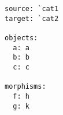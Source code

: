 \begin{verbatim}
source: `cat1
target: `cat2

objects:
  a: a
  b: b
  c: c

morphisms:
  f: h
  g: k


\end{verbatim}